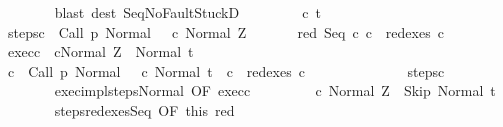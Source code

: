 \begin{isabellebody}
\ \ \ \ \ \ \isamarkupfalse%
\ {\isacharparenleft}blast\ dest{\isacharcolon}\ Seq{\isacharunderscore}NoFaultStuckD{}{\isacharparenright}\isanewline
\ \ \isamarkupfalse%
\isanewline
\ \ \ \ \isamarkupfalse%
\ c{\isacharprime}\ t\isanewline
\ \ \ \ \isamarkupfalse%
\ steps{\isacharunderscore}c{\isacharprime}{\isacharcolon}\ {\isachardoublequoteopen}{\isasymGamma}{\isasymturnstile}\ {\isacharparenleft}Call\ p{\isacharcomma}\ Normal\ {\isasymsigma}{\isacharparenright}\ {\isasymrightarrow}\isactrlsup {\isacharplus}\ {\isacharparenleft}c{\isacharprime}{\isacharcomma}\ Normal\ Z{\isacharparenright}{\isachardoublequoteclose}\ \isanewline
\ \ \ \ \isamarkupfalse%
\ red{\isacharcolon}\ {\isachardoublequoteopen}Seq\ c{}\ c{}\ {\isasymin}\ redexes\ c{\isacharprime}{\isachardoublequoteclose}\isanewline
\ \ \ \ \isamarkupfalse%
\ exec{\isacharunderscore}c{}{\isacharcolon}\ {\isachardoublequoteopen}{\isasymGamma}{\isasymturnstile}\ {\isasymlangle}c{}{\isacharcomma}Normal\ Z{\isasymrangle}\ {\isasymRightarrow}\ Normal\ t{\isachardoublequoteclose}\isanewline
\ \ \ \ \isamarkupfalse%
\ {\isachardoublequoteopen}{\isasymexists}c{\isacharprime}{\isachardot}\ {\isasymGamma}{\isasymturnstile}\ {\isacharparenleft}Call\ p{\isacharcomma}\ Normal\ {\isasymsigma}{\isacharparenright}\ {\isasymrightarrow}\isactrlsup {\isacharplus}\ {\isacharparenleft}c{\isacharprime}{\isacharcomma}\ Normal\ t{\isacharparenright}\ {\isasymand}\ c{}\ {\isasymin}\ redexes\ c{\isacharprime}{\isachardoublequoteclose}\isanewline
\ \ \ \ \isamarkupfalse%
\ {\isacharminus}\isanewline
\ \ \ \ \ \ \isamarkupfalse%
\ steps{\isacharunderscore}c{\isacharprime}\isanewline
\ \ \ \ \ \ \isamarkupfalse%
\isanewline
\ \ \ \ \ \ \isamarkupfalse%
\ exec{\isacharunderscore}impl{\isacharunderscore}steps{\isacharunderscore}Normal\ {\isacharbrackleft}OF\ exec{\isacharunderscore}c{}{\isacharbrackright}\isanewline
\ \ \ \ \ \ \isamarkupfalse%
\ {\isachardoublequoteopen}{\isasymGamma}{\isasymturnstile}\ {\isacharparenleft}c{}{\isacharcomma}\ Normal\ Z{\isacharparenright}\ {\isasymrightarrow}\isactrlsup {\isacharasterisk}\ {\isacharparenleft}Skip{\isacharcomma}\ Normal\ t{\isacharparenright}{\isachardoublequoteclose}\isacommand{{\isachardot}}\isamarkupfalse%
\isanewline
\ \ \ \ \ \ \isamarkupfalse%
\ steps{\isacharunderscore}redexes{\isacharunderscore}Seq\ {\isacharbrackleft}OF\ this\ red{\isacharbrackright}\ \isanewline

\end{isabellebody}
